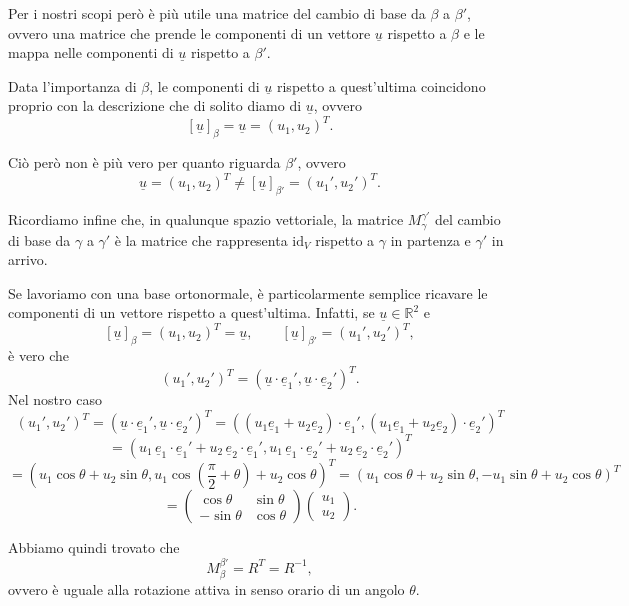 Per i nostri scopi però è più utile una matrice del cambio di base da $\beta$ a $\beta'$, ovvero una matrice che prende le componenti di un vettore $\underline{u}$ rispetto a $\beta$ e le mappa nelle componenti di $\underline{u}$ rispetto a $\beta'$.

Data l'importanza di $\beta$, le componenti di $\underline{u}$ rispetto a quest'ultima coincidono proprio con la descrizione che di solito diamo di $\underline{u}$, ovvero
\[
[\underline{u}]_{\beta}
=
\underline{u}
=
(u_1,u_2)^T.
\]

Ciò però non è più vero per quanto riguarda $\beta'$, ovvero
\[
\underline{u}
=
(u_1,u_2)^T
\neq
[\underline{u}]_{\beta'}
=
(u_1',u_2')^T.
\]

Ricordiamo infine che, in qualunque spazio vettoriale, la matrice $M_{\gamma}^{\gamma'}$ del cambio di base da $\gamma$ a $\gamma'$ è la matrice che rappresenta $\mathrm{id}_V$ rispetto a $\gamma$ in partenza e $\gamma'$ in arrivo.

Se lavoriamo con una base ortonormale, è particolarmente semplice ricavare le componenti di un vettore rispetto a quest'ultima. Infatti, se $\underline{u}\in \mathbb{R}^2$ e
\[
[\underline{u}]_{\beta}
=
(u_1,u_2)^T
=
\underline{u},
\qquad
[\underline{u}]_{\beta'}
=
(u_1',u_2')^T,
\]
è vero che
\[
(u_1',u_2')^T
=
\left(
\underline{u}\cdot \underline{e}_1',
\underline{u}\cdot \underline{e}_2'
\right)^T.
\]
Nel nostro caso
\[
(u_1',u_2')^T
=
\left(
\underline{u}\cdot \underline{e}_1',
\underline{u}\cdot \underline{e}_2'
\right)^T
=
\left(
(u_1\underline{e}_1+u_2\underline{e}_2)\cdot \underline{e}_1',
(u_1\underline{e}_1+u_2\underline{e}_2)\cdot \underline{e}_2'
\right)^T
\]
\[
=
\left(
u_1\,\underline{e}_1\cdot \underline{e}_1'
+
u_2\,\underline{e}_2\cdot \underline{e}_1',
u_1\,\underline{e}_1\cdot \underline{e}_2'
+
u_2\,\underline{e}_2\cdot \underline{e}_2'
\right)^T
\]
\[
=
\left(
u_1\cos\theta+u_2\sin\theta,
u_1\cos\left(\frac{\pi}{2}+\theta\right)+u_2\cos\theta
\right)^T
=
\left(
u_1\cos\theta+u_2\sin\theta,
-u_1\sin\theta+u_2\cos\theta
\right)^T
\]
\[
=
\begin{pmatrix}
\cos\theta & \sin\theta\\
-\sin\theta & \cos\theta
\end{pmatrix}
\begin{pmatrix}
u_1\\
u_2
\end{pmatrix}.
\]

Abbiamo quindi trovato che
\[
M_{\beta}^{\beta'}
=
R^T
=
R^{-1},
\]
ovvero è uguale alla rotazione attiva in senso orario di un angolo $\theta$.

